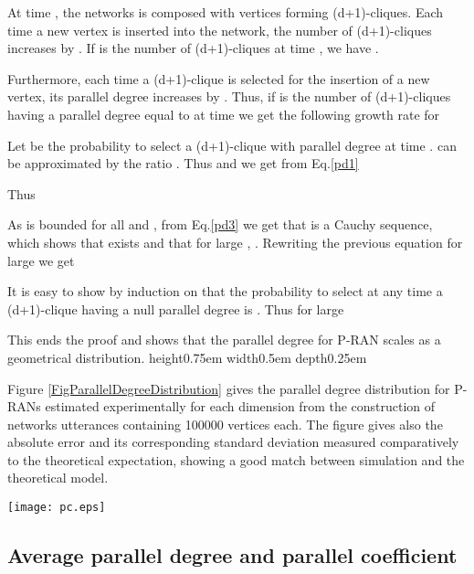 \documentclass[11pt]{iopart}
\newenvironment{proof}[1][Proof]{\begin{trivlist}
    \item[\hskip \labelsep {\bfseries #1}]}{\end{trivlist}}
\newcommand{\qed}{\nobreak \ifvmode \relax \else
          \ifdim\lastskip<1.5em \hskip-\lastskip
          \hskip1.5em plus0em minus0.5em \fi \nobreak
          \vrule height0.75em width0.5em depth0.25em\fi}
\begin{document}
\begin{proof}
At time , the networks is composed with  vertices forming  (d+1)-cliques. Each time a new vertex is inserted into the network, the number of (d+1)-cliques increases by . If  is the number of (d+1)-cliques at time , we have .

Furthermore, each time a (d+1)-clique  is selected for the insertion of a new vertex, its parallel degree  increases by . Thus, if  is the number of (d+1)-cliques having a parallel degree equal to  at time  we get the following growth rate for 
 
 

Let  be the probability to select a (d+1)-clique with parallel degree  at time .  can be approximated by the ratio . Thus  and we get from Eq.\ref{pd1}

 

Thus


As  is bounded for all  and , from Eq.\ref{pd3} we get that  is a Cauchy sequence, which shows that  exists and that for large , . Rewriting the previous equation for large  we get

 

It is easy to show by induction on  that the probability to select at any time  a (d+1)-clique having a null parallel degree is . Thus for large 


This ends the proof and shows that the parallel degree for P-RAN scales as a geometrical distribution.
\qed
\end{proof}

Figure \ref{FigParallelDegreeDistribution} gives the parallel degree distribution for P-RANs estimated experimentally for each dimension from the construction of   networks utterances containing 100000 vertices each. The figure gives also the absolute error and its corresponding standard deviation measured comparatively to the theoretical expectation, showing a good match between simulation and the theoretical model.

\begin{figure*}[htbp]
\centering
\texttt{[image: pc.eps]}
\caption{Parallel Degree distribution estimated from  2-dimensional P-RANs containing 100000 vertices each. Error and standard deviation to theory are given on the right vertical axis.}
\label{FigParallelDegreeDistribution}
\end{figure*}


\subsection{Average parallel degree and parallel coefficient}
\end{document}
